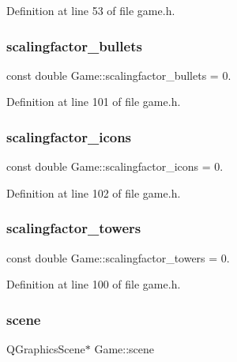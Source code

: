 Definition at line 53 of file game.\+h.

\mbox{\label{class_game_aeec547aa25329dcd9d52bfc1c8fa8bb3}} 
\subsubsection{\texorpdfstring{scalingfactor\+\_\+bullets}{scalingfactor\_bullets}}
{\footnotesize\ttfamily const double Game\+::scalingfactor\+\_\+bullets = 0.}



Definition at line 101 of file game.\+h.

\mbox{\label{class_game_a50835e7c47a3e5d6fc919ce3a163be88}} 
\subsubsection{\texorpdfstring{scalingfactor\+\_\+icons}{scalingfactor\_icons}}
{\footnotesize\ttfamily const double Game\+::scalingfactor\+\_\+icons = 0.}



Definition at line 102 of file game.\+h.

\mbox{\label{class_game_a6c1ca48f17f6934432d01bfa7f762a04}} 
\subsubsection{\texorpdfstring{scalingfactor\+\_\+towers}{scalingfactor\_towers}}
{\footnotesize\ttfamily const double Game\+::scalingfactor\+\_\+towers = 0.}



Definition at line 100 of file game.\+h.

\mbox{\label{class_game_a8119e3b9a632906c6808fa294b46a92a}} 
\subsubsection{\texorpdfstring{scene}{scene}}
{\footnotesize\ttfamily Q\+Graphics\+Scene$\ast$ Game\+::scene}



